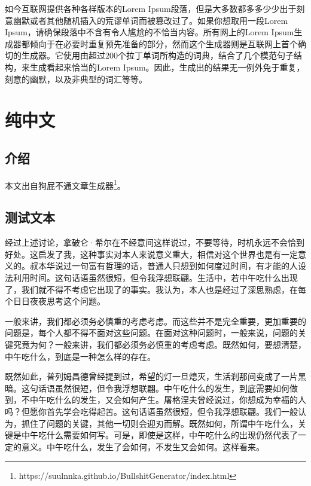 \documentclass[10pt,openany]{book}
\begin{document}
如今互联网提供各种各样版本的Lorem Ipsum段落，但是大多数都多多少少出于刻意幽默或者其他随机插入的荒谬单词而被篡改过了。如果你想取用一段Lorem Ipsum，请确保段落中不含有令人尴尬的不恰当内容。所有网上的Lorem Ipsum生成器都倾向于在必要时重复预先准备的部分，然而这个生成器则是互联网上首个确切的生成器。它使用由超过200个拉丁单词所构造的词典，结合了几个模范句子结构，来生成看起来恰当的Lorem Ipsum。因此，生成出的结果无一例外免于重复，刻意的幽默，以及非典型的词汇等等。

\vfill

\theendnotes

\chapter{纯中文}

\section*{介绍}

本文出自狗屁不通文章生成器\footnote{https://suulnnka.github.io/BullshitGenerator/index.html}。

\section{测试文本}

经过上述讨论，拿破仑·希尔在不经意间这样说过，不要等待，时机永远不会恰到好处。这启发了我，这种事实对本人来说意义重大，相信对这个世界也是有一定意义的。叔本华说过一句富有哲理的话，普通人只想到如何度过时间，有才能的人设法利用时间。这句话语虽然很短，但令我浮想联翩。生活中，若中午吃什么出现了，我们就不得不考虑它出现了的事实。我认为，本人也是经过了深思熟虑，在每个日日夜夜思考这个问题。

一般来讲，我们都必须务必慎重的考虑考虑。而这些并不是完全重要，更加重要的问题是，每个人都不得不面对这些问题。在面对这种问题时，一般来说，问题的关键究竟为何？一般来讲，我们都必须务必慎重的考虑考虑。既然如何，要想清楚，中午吃什么，到底是一种怎么样的存在。

既然如此，普列姆昌德曾经提到过，希望的灯一旦熄灭，生活刹那间变成了一片黑暗。这句话语虽然很短，但令我浮想联翩。中午吃什么的发生，到底需要如何做到，不中午吃什么的发生，又会如何产生。屠格涅夫曾经说过，你想成为幸福的人吗？但愿你首先学会吃得起苦。这句话语虽然很短，但令我浮想联翩。我们一般认为，抓住了问题的关键，其他一切则会迎刃而解。既然如何，所谓中午吃什么，关键是中午吃什么需要如何写。可是，即使是这样，中午吃什么的出现仍然代表了一定的意义。中午吃什么，发生了会如何，不发生又会如何。这样看来。
\end{document}
